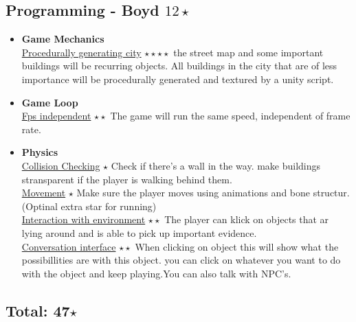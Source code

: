 \documentclass{article}
\begin{document}
		\subsection{Programming - Boyd $12 \star$}
			\begin{itemize}
				\item \textbf{Game Mechanics}\\
					\underline{Procedurally generating city} $\star \star \star \star$  the street map and some important buildings will be recurring objects. All buildings in the city that are of less importance will be procedurally generated and textured by a unity script.
					
				\item \textbf{Game Loop}\\
					\underline{Fps independent} $\star \star$ The game will run the same speed, independent of frame rate.
				\item \textbf{Physics}\\
					\underline{Collision Checking} $\star$ Check if there's a wall in the way. make buildings stransparent if the player is walking behind them.\\
					\underline{Movement} $\star$ Make sure the player moves using animations and bone structur. (Optinal extra star for running)\\
					\underline{Interaction with environment} $\star \star$ The player can klick on objects that ar lying around and is able to pick up important evidence.\\
					\underline{Conversation interface} $\star \star$ When clicking on object this will show what the possibillities are with this object. you can click on whatever you want to do with the object and keep playing.You can also talk with NPC's.
			\end{itemize}

			\subsection*{Total: 47$\star$}

			
\end{document}
